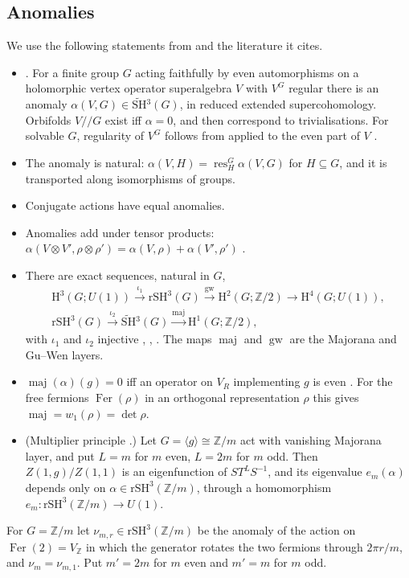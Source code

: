 \documentclass[11pt]{amsart}
\theoremstyle{definition}
\newcommand{\Z}{\mathbb{Z}}
\newcommand{\Fer}{\operatorname{Fer}}
\newcommand{\res}{\operatorname{res}}
\newcommand{\maj}{\operatorname{maj}}
\newcommand{\gw}{\operatorname{gw}}
\newcommand{\SH}{\widetilde{\mathrm{SH}}{}^3}
\newcommand{\rSH}{\mathrm{rSH}^3}
\newcommand{\Hc}{\mathrm{H}}
\newcommand{\orb}{/\!\!/}
\begin{document}
\subsection{Anomalies}\label{sec:anomalies}
We use the following statements from \cite{GJF} and the literature it cites.
\begin{itemize}
\item[(A1)] \cite[Thm.~4.2]{GJF}. For a finite group $G$ acting faithfully by even automorphisms on a
  holomorphic vertex operator superalgebra $V$ with $V^G$ regular there is an anomaly
  $\alpha(V,G)\in\SH(G)$, in reduced extended supercohomology. Orbifolds $V\orb G$ exist iff
  $\alpha=0$, and then correspond to trivialisations. For solvable $G$, regularity of $V^G$ follows from
  \cite{CM} applied to the even part of $V$ \cite[\S4]{GJF}.
\item[(A2)] The anomaly is natural: $\alpha(V,H)=\res^G_H\alpha(V,G)$ for $H\subseteq G$, and it is
  transported along isomorphisms of groups.
\item[(A3)] Conjugate actions have equal anomalies.
\item[(A4)] Anomalies add under tensor products: $\alpha(V\otimes V',\rho\otimes\rho')=\alpha(V,\rho)+
  \alpha(V',\rho')$ \cite[\S5]{GJF17}.
\item[(A5)] There are exact sequences, natural in $G$,
  \begin{gather*}
    \Hc^3(G;U(1))\xrightarrow{\iota_1}\rSH(G)\xrightarrow{\gw}\Hc^2(G;\Z/2)\to\Hc^4(G;U(1)),\\
    \rSH(G)\xrightarrow{\iota_2}\SH(G)\xrightarrow{\maj}\Hc^1(G;\Z/2),
  \end{gather*}
  with $\iota_1$ and $\iota_2$ injective \cite[\S4]{GJF}, \cite{WG}, \cite[\S5.4]{GJF17}. The maps
  $\maj$ and $\gw$ are the Majorana and Gu--Wen layers.
\item[(A6)] $\maj(\alpha)(g)=0$ iff an operator on $V_R$ implementing $g$ is even \cite[\S4]{GJF}. For
  the free fermions $\Fer(\rho)$ in an orthogonal representation $\rho$ this gives $\maj=w_1(\rho)=\det
  \rho$.
\item[(A7)] (Multiplier principle \cite[\S4]{GJF}.) Let $G=\langle g\rangle\cong\Z/m$ act with
  vanishing Majorana layer, and put $L=m$ for $m$ even, $L=2m$ for $m$ odd. Then $Z(1,g)/Z(1,1)$ is an
  eigenfunction of $ST^LS^{-1}$, and its eigenvalue $e_m(\alpha)$ depends only on $\alpha\in\rSH(\Z/m)$,
  through a homomorphism $e_m\colon\rSH(\Z/m)\to U(1)$.
\end{itemize}
For $G=\Z/m$ let $\nu_{m,r}\in\rSH(\Z/m)$ be the anomaly of the action on $\Fer(2)=V_{\Z}$ in which the
generator rotates the two fermions through $2\pi r/m$, and $\nu_m=\nu_{m,1}$. Put $m'=2m$ for $m$ even
and $m'=m$ for $m$ odd.
\end{document}
